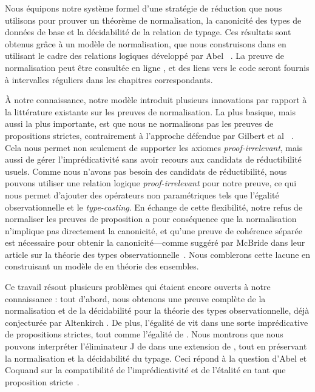Nous équipons notre système formel d'une stratégie de réduction que nous utilisons 
pour prouver un théorème de normalisation, la canonicité des types de données de 
base et la décidabilité de la relation de typage. 
% 
Ces résultats sont obtenus grâce à un modèle de normalisation, que nous construisons 
dans \Agda en utilisant le cadre des relations logiques développé par Abel 
\etal~. 
% 
La preuve de normalisation peut être consultée en ligne , 
et des liens vers le code seront fournis à intervalles réguliers dans les chapitres 
correspondants.

À notre connaissance, notre modèle introduit plusieurs innovations par rapport 
à la littérature existante sur les preuves de normalisation. 
% 
La plus basique, mais aussi la plus importante, est que nous ne normalisons pas 
les preuves de propositions strictes, contrairement à l'approche défendue par 
Gilbert et al \etal~. 
% 
Cela nous permet non seulement de supporter les axiomes \emph{proof-irrelevant}, 
mais aussi de gérer l'imprédicativité sans avoir recours aux candidats de 
réductibilité usuels. 
% 
Comme nous n'avons pas besoin des candidats de réductibilité, nous pouvons 
utiliser une relation logique \emph{proof-irrelevant} pour notre preuve, ce 
qui nous permet d'ajouter des opérateurs non paramétriques tels que l'égalité 
observationnelle et le \emph{type-casting}. 
% 
En échange de cette flexibilité, notre refus de normaliser les preuves de
proposition a pour conséquence que la normalisation n'implique pas directement 
la canonicité, et qu'une preuve de cohérence séparée est nécessaire pour 
obtenir la canonicité---comme suggéré par McBride \etal dans leur article sur 
la théorie des types observationnelle~. 
% 
Nous comblerons cette lacune en construisant un modèle de \SetoidCC en théorie 
des ensembles. 

Ce travail résout plusieurs problèmes qui étaient encore ouverts à notre 
connaissance : tout d'abord, nous obtenons une preuve complète de la 
normalisation et de la décidabilité pour la théorie des types observationnelle, 
déjà conjecturée par Altenkirch \etal. 
% 
De plus, l'égalité de \SetoidCC vit dans une sorte imprédicative de propositions 
strictes, tout comme l'égalité de \Lean. 
% 
Nous montrons que nous pouvons interpréter l'éliminateur J de \Lean dans une 
extension de \SetoidCC, tout en préservant la normalisation et la décidabilité 
du typage. 
% 
Ceci répond à la question d'Abel et Coquand sur la compatibilité de 
l'imprédicativité et de l'étalité en tant que proposition stricte~.

